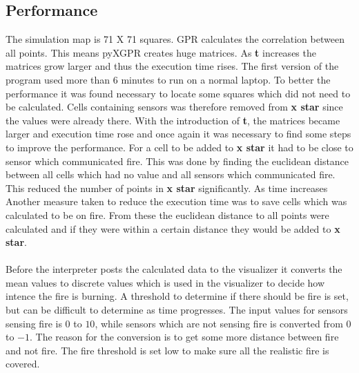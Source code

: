 \subsection{Performance}
The simulation map is 71 X 71 squares. GPR calculates the correlation between all points. This means pyXGPR creates huge matrices. As \textbf{t} increases the matrices grow larger and thus the execution time rises. The first version of the program used more than 6 minutes to run on a normal laptop. To better the performance it was found necessary to locate some squares which did not need to be calculated. Cells containing sensors was therefore removed from \textbf{x star} since the values were already there. With the introduction of \textbf{t}, the matrices became larger and execution time rose and once again it was necessary to find some steps to improve the performance. For a cell to be added to \textbf{x star} it had to be close to sensor which communicated fire. This was done by finding the euclidean distance between all cells which had no value and all sensors which communicated fire. This reduced the number of points in \textbf{x star} significantly. As time increases Another measure taken to reduce the execution time was to save cells which was calculated to be on fire. From these the euclidean distance to all points were calculated and if they were within a certain distance they would be added to \textbf{x star}.
\\\\
Before the interpreter posts the calculated data to the visualizer it converts the mean values to discrete values which is used in the visualizer to decide how intence the fire is burning. A threshold to determine if there should be fire is set, but can be difficult to determine as time progresses. The input values for sensors sensing fire is $0 $ to $10$, while sensors which are not sensing fire is converted from $ 0 $ to $ -1 $. The reason for the conversion is to get some more distance between fire and not fire. The fire threshold is set low to make sure all the realistic fire is covered.
\\\\
